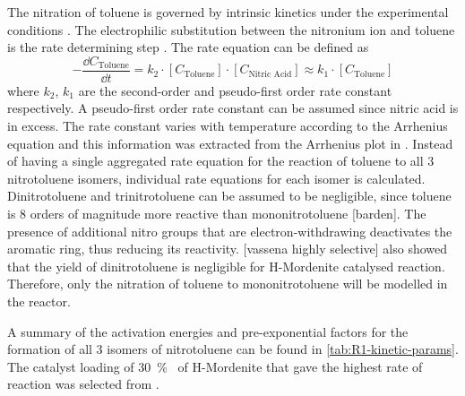 
The nitration of toluene is governed by intrinsic kinetics under the experimental conditions \cite{jeeru_kinetics_2018}. The electrophilic substitution between the  nitronium ion and toluene is the rate determining step \cite{carey_advanced_2007}. The rate equation can be defined as  
\begin{equation}
-\frac{\dd C_\mathrm{Toluene}}{\dd t} = k_{2} \cdot [C_\mathrm{Toluene}] \cdot [C_\text{Nitric Acid}] \approx k_{1} \cdot [C_\mathrm{Toluene}]
\end{equation}
where $k_2$, $k_1$ are the second-order and pseudo-first order rate constant respectively. A pseudo-first order rate constant can be assumed since nitric acid is in excess. The rate constant varies with temperature according to the Arrhenius equation and this information was extracted from the Arrhenius plot in \textcite{jeeru_kinetics_2018}. Instead of having a single aggregated rate equation for the reaction of toluene to all 3 nitrotoluene isomers, individual rate equations for each isomer is calculated. Dinitrotoluene and trinitrotoluene can be assumed to be negligible, since toluene is 8 orders of magnitude more reactive than mononitrotoluene [barden]. The presence of additional nitro groups that are electron-withdrawing deactivates the aromatic ring, thus reducing its reactivity. [vassena highly selective] also showed that the yield of dinitrotoluene is negligible for H-Mordenite catalysed reaction. Therefore, only the nitration of toluene to mononitrotoluene will be modelled in the reactor.

A summary of the activation energies and pre-exponential factors for the formation of all 3 isomers of nitrotoluene can be found in \cref{tab:R1-kinetic-params}. The catalyst loading of \SI{30}{\percent\wv} of H-Mordenite that gave the highest rate of reaction was selected from \textcite{jeeru_kinetics_2018}.
